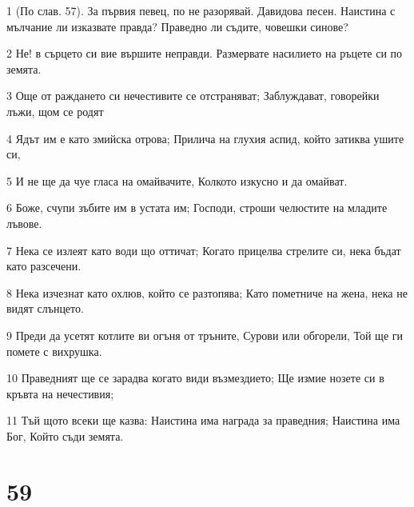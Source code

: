 \par 1 (По слав. 57). За първия певец, по не разорявай. Давидова песен. Наистина с мълчание ли изказвате правда? Праведно ли съдите, човешки синове?
\par 2 Не! в сърцето си вие вършите неправди. Размервате насилието на ръцете си по земята.
\par 3 Още от раждането си нечестивите се отстраняват; Заблуждават, говорейки лъжи, щом се родят
\par 4 Ядът им е като змийска отрова; Прилича на глухия аспид, който затиква ушите си,
\par 5 И не ще да чуе гласа на омайвачите, Колкото изкусно и да омайват.
\par 6 Боже, счупи зъбите им в устата им; Господи, строши челюстите на младите лъвове.
\par 7 Нека се излеят като води що оттичат; Когато прицелва стрелите си, нека бъдат като разсечени.
\par 8 Нека изчезнат като охлюв, който се разтопява; Като пометниче на жена, нека не видят слънцето.
\par 9 Преди да усетят котлите ви огъня от тръните, Сурови или обгорели, Той ще ги помете с вихрушка.
\par 10 Праведният ще се зарадва когато види възмездието; Ще измие нозете си в кръвта на нечестивия;
\par 11 Тъй щото всеки ще казва: Наистина има награда за праведния; Наистина има Бог, Който съди земята.

\chapter{59}

